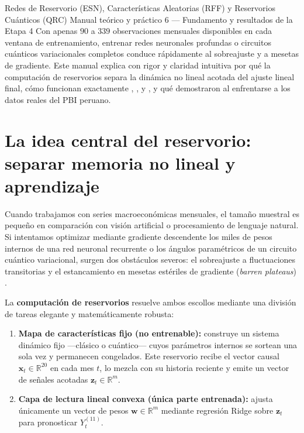 \documentclass[12pt,letterpaper]{article}
\begin{document}
\apacabecera
  {Redes de Reservorio (ESN), Características Aleatorias (RFF) y Reservorios Cuánticos (QRC)}
  {Manual teórico y práctico 6 — Fundamento y resultados de la Etapa 4}
  {Con apenas \(90\) a \(339\) observaciones mensuales disponibles en cada ventana de entrenamiento, entrenar redes neuronales profundas o circuitos cuánticos variacionales completos conduce rápidamente al sobreajuste y a mesetas de gradiente. Este manual explica con rigor y claridad intuitiva por qué la computación de reservorios separa la dinámica no lineal acotada del ajuste lineal final, cómo funcionan exactamente , ,  y , y qué demostraron al enfrentarse a los datos reales del PBI peruano.}

\section{La idea central del reservorio: separar memoria no lineal y aprendizaje}

Cuando trabajamos con series macroeconómicas mensuales, el tamaño muestral es pequeño en comparación con visión artificial o procesamiento de lenguaje natural. Si intentamos optimizar mediante gradiente descendente los miles de pesos internos de una red neuronal recurrente o los ángulos paramétricos de un circuito cuántico variacional, surgen dos obstáculos severos: el sobreajuste a fluctuaciones transitorias y el estancamiento en mesetas estériles de gradiente (\emph{barren plateaus}) \parencite{cerezo2021}.

La \textbf{computación de reservorios} resuelve ambos escollos mediante una división de tareas elegante y matemáticamente robusta:
\begin{enumerate}
  \item \textbf{Mapa de características fijo (no entrenable):} construye un sistema dinámico fijo —clásico o cuántico— cuyos parámetros internos se sortean una sola vez y permanecen congelados. Este reservorio recibe el vector causal \(\mathbf{x}_t \in \mathbb{R}^{20}\) en cada mes \(t\), lo mezcla con su historia reciente y emite un vector de señales acotadas \(\mathbf{z}_t \in \mathbb{R}^{m}\).
  \item \textbf{Capa de lectura lineal convexa (única parte entrenada):} ajusta únicamente un vector de pesos \(\mathbf{w} \in \mathbb{R}^{m}\) mediante regresión Ridge sobre \(\mathbf{z}_t\) para pronosticar \(Y_t^{(11)}\).
\end{enumerate}
\end{document}
